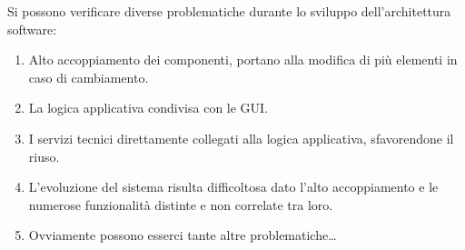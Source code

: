 {    
    Si possono verificare diverse problematiche durante lo sviluppo dell'architettura software:
    \begin{enumerate}
        \item Alto accoppiamento dei componenti, portano alla modifica di più elementi in caso di cambiamento.
        \item La logica applicativa condivisa con le GUI.
        \item I servizi tecnici direttamente collegati alla logica applicativa, sfavorendone il riuso.
        \item L'evoluzione del sistema risulta difficoltosa dato l'alto accoppiamento e le numerose funzionalità
              distinte e non correlate tra loro.
        \item Ovviamente possono esserci tante altre problematiche\dots
    \end{enumerate}
}